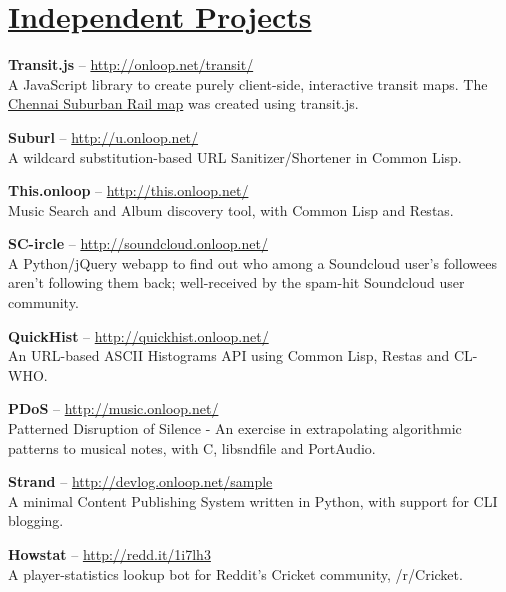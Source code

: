 \documentclass[10pt,a4paper]{moderncv}
\begin{document}
\section{{\href{http://github.com/pranavrc/}{Independent Projects}}}

\cvlistitem
{\textbf{Transit.js} -- {{\href{http://onloop.net/transit}{\small http://onloop.net/transit/}}}
  \\A JavaScript library to create purely client-side, interactive transit maps. The {{\href{http://onloop.net/chennairail}{Chennai Suburban Rail map}}} was created using transit.js.}

\cvlistitem
{\textbf{Suburl} -- {{\href{http://u.onloop.net/}{\small
http://u.onloop.net/}}}
  \\A wildcard substitution-based URL Sanitizer/Shortener in Common Lisp.}

\cvlistitem
{\textbf{This.onloop} -- {{\href{http://this.onloop.net/}{\small http://this.onloop.net/}}}
  \\Music Search and Album discovery tool, with Common Lisp and Restas.}

\cvlistitem
{\textbf{SC-ircle} -- {{\href{http://soundcloud.onloop.net/}{\small http://soundcloud.onloop.net/}}}
  \\A Python/jQuery webapp to find out who among a Soundcloud user's followees aren't following them back; well-received by the spam-hit Soundcloud user community.}

\cvlistitem
{\textbf{QuickHist} -- {{\href{http://quickhist.onloop.net/}{\small http://quickhist.onloop.net/}}}
  \\An URL-based ASCII Histograms API using Common Lisp, Restas and CL-WHO.}

\cvlistitem
{\textbf{PDoS} -- {{\href{http://music.onloop.net/}{\small http://music.onloop.net/}}}
  \\Patterned Disruption of Silence - An exercise in extrapolating algorithmic patterns to musical notes, with C, libsndfile and PortAudio.}

\cvlistitem
{\textbf{Strand} -- {{\href{http://devlog.onloop.net/sample}{\small http://devlog.onloop.net/sample}}}
  \\A minimal Content Publishing System written in Python, with support for CLI blogging.}

\cvlistitem
{\textbf{Howstat} -- {{\href{http://redd.it/1i7lh3}{\small http://redd.it/1i7lh3}}}
  \\A player-statistics lookup bot for Reddit's Cricket community, /r/Cricket.}
\end{document}
